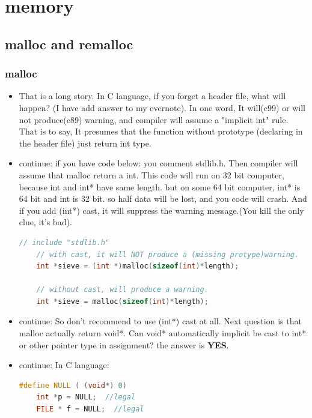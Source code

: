 \documentclass[a4paper,12pt,twoside]{book}
\begin{document}
\section{memory}

\subsection{malloc and remalloc}
\subsubsection{malloc}
\begin{itemize}
	\item That is a long story. In C language, if you forget a header file, what will happen? (I have add answer to my evernote). In one word, It will(c99) or will not produce(c89) warning, and compiler will assume a "implicit int" rule. That is to say, It presumes that the function without prototype (declaring in the header file) just return int type.
	
	\item continue: if you have code below: you comment stdlib.h. Then compiler will assume that malloc return a int.  This code will run on 32 bit computer, because int and int* have same length. but on some 64 bit computer, int* is 64 bit and int is 32 bit.  so half data will be lost, and you code will crash.
	And if you add (int*) cast, it will suppress the warning message.(You kill the only clue, it's bad).
	\begin{lstlisting}[frame=single, language=c++]
	// include "stdlib.h"
	// with cast, it will NOT produce a (missing protype)warning.
	int *sieve = (int *)malloc(sizeof(int)*length);
	
	// without cast, will produce a warning.
	int *sieve = malloc(sizeof(int)*length);
	\end{lstlisting}
	
	\item continue: So don't recommend to use (int*) cast at all. Next question is that malloc actually return void*. Can void* automatically implicit be cast to int* or other pointer type in assignment? the answer is \textbf{YES}.
	
	\item  continue: In C language:
	\begin{lstlisting}[frame=single, language=c++]
	#define NULL ( (void*) 0)
	int *p = NULL;  //legal
	FILE * f = NULL;  //legal
	\end{lstlisting}
	

\end{itemize}
\end{document}

